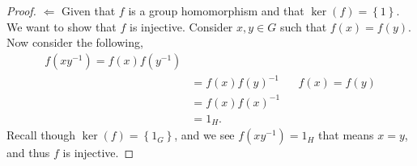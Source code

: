 \documentclass[10pt]{article}
\newcommand{\set}[1]{\left\{#1\right\}} %
\begin{document}
\begin{itemize}
\begin{proof}
            $\Leftarrow$ Given that $f$ is a group homomorphism and that $\ker(f) = \set{1}$. We want to show that $f$ is injective. Consider $x,y \in G$ such that $f(x) = f(y)$. Now consider the following,
            \begin{align*}
                f(xy^{-1}) = f(x)f(y^{-1}) \\
                &= f(x)f(y)^{-1} && f(x) = f(y) \\
                &= f(x)f(x)^{-1} \\
                &= 1_H.
            \end{align*}
            Recall though $\ker(f) = \set{1_G}$, and we see $f(xy^{-1}) = 1_H$ that means $x = y$, and thus $f$ is injective.  
        \end{proof}
    \end{itemize}
\end{document}
